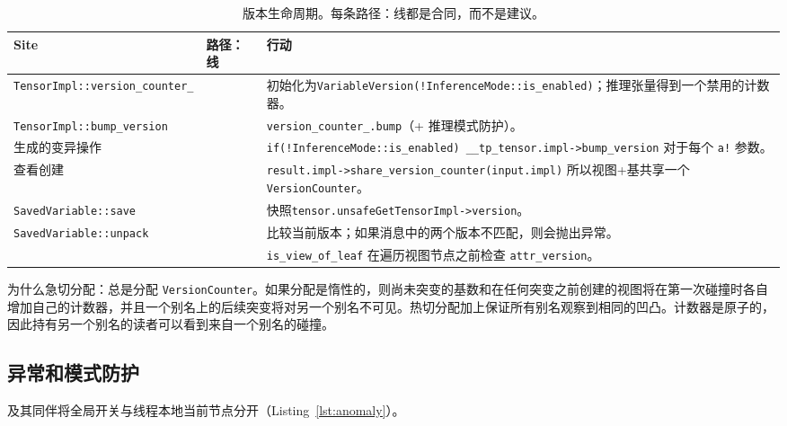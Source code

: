 \begin{table}[H]
\centering
\caption{版本生命周期。每条路径：线都是合同，而不是建议。}
\label{tab:verlife}
\small
\begin{tabular}{lll}
\toprule
Site & 路径：线 & 行动 \\
\midrule
\texttt{TensorImpl::version\_counter\_} &  & 初始化为\texttt{VariableVersion(!InferenceMode::is\_enabled)}；推理张量得到一个禁用的计数器。 \\
\texttt{TensorImpl::bump\_version} &  & \texttt{version\_counter\_.bump}（+ 推理模式防护）。 \\
生成的变异操作 &  & \texttt{if(!InferenceMode::is\_enabled) \_\_tp\_tensor.impl->bump\_version} 对于每个 \texttt{a!} 参数。 \\
查看创建 &  & \texttt{result.impl->share\_version\_counter(input.impl)} 所以视图+基共享一个 \texttt{VersionCounter}。 \\
\texttt{SavedVariable::save} &  & 快照\texttt{tensor.unsafeGetTensorImpl->version}。 \\
\texttt{SavedVariable::unpack} &  & 比较当前版本；如果消息中的两个版本不匹配，则会抛出异常。 \\
  &  & \texttt{is\_view\_of\_leaf} 在遍历视图节点之前检查 \texttt{attr\_version}。 \\
\bottomrule
\end{tabular}
\end{table}

为什么急切分配：总是分配 \texttt{VersionCounter}。如果分配是惰性的，则尚未突变的基数和在任何突变之前创建的视图将在第一次碰撞时各自增加自己的计数器，并且一个别名上的后续突变将对另一个别名不可见。热切分配加上保证所有别名观察到相同的凹凸。计数器是原子的，因此持有另一个别名的读者可以看到来自一个别名的碰撞。

\subsection{异常和模式防护}
\label{subsec:guards}

及其同伴将全局开关与线程本地当前节点分开（Listing~\ref{lst:anomaly}）。

